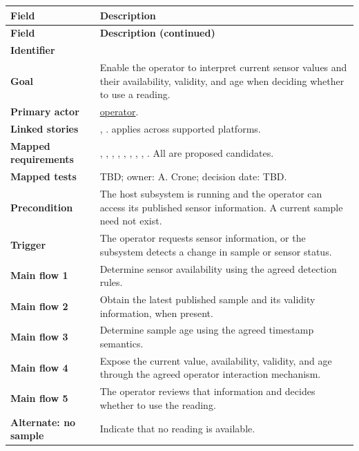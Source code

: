 \begin{tabularx}{\linewidth}{L{3.5cm}Y}
\caption{Monitor Sensor Status\label{Table:UC005}}\\
\toprule
\textbf{Field} & \textbf{Description}\\\midrule\endfirsthead
\textbf{Field} & \textbf{Description (continued)}\\\midrule\endhead
\bottomrule\endlastfoot
\textbf{Identifier} & \\
\textbf{Goal} & Enable the operator to interpret current sensor values and their availability, validity, and age when deciding whether to use a reading.\\
\textbf{Primary actor} & \hyperref[Stakeholder:Operator]{operator}.\\
\textbf{Linked stories} & , .  applies across supported platforms.\\
\textbf{Mapped requirements} & , , , , , , , , . All are proposed candidates.\\
\textbf{Mapped tests} & TBD; owner: A. Crone; decision date: TBD.\\
\textbf{Precondition} & The host subsystem is running and the operator can access its published sensor information. A current sample need not exist.\\
\textbf{Trigger} & The operator requests sensor information, or the subsystem detects a change in sample or sensor status.\\
\textbf{Main flow 1} & Determine sensor availability using the agreed detection rules.\\
\textbf{Main flow 2} & Obtain the latest published sample and its validity information, when present.\\
\textbf{Main flow 3} & Determine sample age using the agreed timestamp semantics.\\
\textbf{Main flow 4} & Expose the current value, availability, validity, and age through the agreed operator interaction mechanism.\\
\textbf{Main flow 5} & The operator reviews that information and decides whether to use the reading.\\
\textbf{Alternate: no sample} & Indicate that no reading is available.\\

\end{tabularx}

